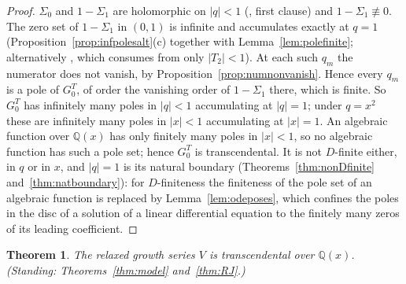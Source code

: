 \documentclass[11pt]{article}
\theoremstyle{plain}
\newtheorem{theorem}{Theorem}
\theoremstyle{definition}
\theoremstyle{remark}
\newcommand{\Q}{\mathbb{Q}}
\theoremstyle{plain}\newtheorem*{maintheorem}{Main Theorem}
\begin{document}
\begin{proof}
$\Sigma_0$ and $1-\Sigma_1$ are holomorphic on $|q|<1$ ({\cite[Theorem \textup{thm:blocks}]{Bonfioli2026bB}}, first clause) and
$1-\Sigma_1\not\equiv0$. The zero set of $1-\Sigma_1$ in $(0,1)$ is infinite and accumulates
exactly at $q=1$ (Proposition~\ref{prop:infpolesalt}\textup{(c)} together with Lemma~\ref{lem:polefinite};
alternatively {\cite[Lemma ``infinitude and accumulation of the travel poles'', \textup{lem:infpoles}]{Bonfioli2026bB}}, which consumes from {\cite[Lemma ``absolute bound on $T_2$'', \textup{lem:T2abs}]{Bonfioli2026bB}} only
$|T_2|<1$). At each such $q_m$ the numerator does not
vanish, by Proposition~\ref{prop:numnonvanish}. Hence every $q_m$ is a pole of $G^T_0$, of order
the vanishing order of $1-\Sigma_1$ there, which is finite. So $G^T_0$ has infinitely many poles in
$|q|<1$ accumulating at $|q|=1$; under $q=x^2$ these are infinitely many poles in $|x|<1$
accumulating at $|x|=1$. An algebraic function over $\Q(x)$ has only finitely many poles in
$|x|<1$, so no algebraic function has such a pole set; hence $G^T_0$ is transcendental. It is not
$D$-finite either, in $q$ or in $x$, and $|q|=1$ is its natural boundary
(Theorems~\ref{thm:nonDfinite} and~\ref{thm:natboundary}): for $D$-finiteness the finiteness of the
pole set of an algebraic function is replaced by Lemma~\ref{lem:odeposes}, which confines the poles
in the disc of a solution of a linear differential equation to the finitely many zeros of its
leading coefficient.
\end{proof}

\begin{theorem}\label{thm:V}
The relaxed growth series $V$ is transcendental over $\Q(x)$.
\textup{(}Standing: Theorems~\ref{thm:model} and~\ref{thm:RJ}.\textup{)}
\end{theorem}
\end{document}
